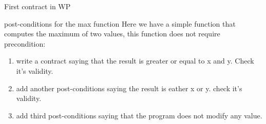 \begin{frame}{First contract in WP}
\begin{exampleblock}{post-conditions for  the max function}
Here we have a simple function that computes the maximum of two values, this function does not require precondition:

\begin{enumerate}
	\item write a contract saying that the result is greater or equal to x and y. Check it's validity.
	\item add another post-conditions saying the result is eather x or y. check it's validity.
	\item add third post-conditions saying that the program does not modify any value.
\end{enumerate}
\end{exampleblock}
\end{frame}


